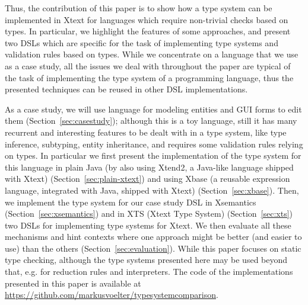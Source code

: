 Thus, the contribution of this paper is to show how a type system can be
implemented in Xtext for languages  which require non-trivial checks based on types. In particular, we
highlight the features of some approaches, and present two DSLs which are
specific for the task of implementing type systems and validation rules based on
types.   While we concentrate on a language that we use as a case study, all the
issues we deal with throughout the paper are typical of the task of implementing
the type system of a programming language, thus the presented techniques can be
reused in other DSL implementations. 

As a case study, we will use language for modeling entities and GUI forms to
edit them (Section~\ref{sec:casestudy}); although this is a toy language, still
it has many recurrent and interesting features to be dealt with in a type
system, like type inference, subtyping, entity inheritance, and requires some
validation rules relying on types.  In particular we first present the
implementation of the type system for this language in plain Java (by also using
Xtend2, a Java-like language shipped with Xtext) (Section~\ref{sec:plain-xtext})
and using Xbase (a reusable expression language, integrated with Java, shipped
with Xtext) (Section~\ref{sec:xbase}).  Then, we implement the type system for our case study DSL in
Xsemantics (Section~\ref{sec:xsemantics}) and in XTS (Xtext Type System)
(Section~\ref{sec:xts}) two DSLs for implementing type systems for Xtext.
We then evaluate all these mechanisms and hint contexts 
where one approach might be better (and easier to use) than the others
(Section~\ref{sec:evaluation}).
While this paper focuses on static type checking, although the type systems
presented here may be used beyond that, e.g. for reduction rules and
interpreters.  The code of the implementations presented in this paper is
available at \url{https://github.com/markusvoelter/typesystemcomparison}.


